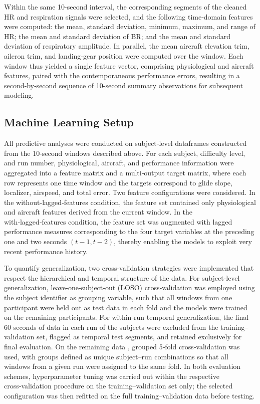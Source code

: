\documentclass[11pt, a4paper]{article}
\begin{document}
Within the same 10-second interval, the corresponding segments of the cleaned HR and respiration signals were selected, and the following time‑domain features were computed: the mean, standard deviation, minimum, maximum, and range of HR; the mean and standard deviation of BR; and the mean and standard deviation of respiratory amplitude. In parallel, the mean aircraft elevation trim, aileron trim, and landing‑gear position were computed over the window. Each window thus yielded a single feature vector, comprising physiological and aircraft features, paired with the contemporaneous performance errors, resulting in a second‑by‑second sequence of 10-second summary observations for subsequent modeling.

\subsection{Machine Learning Setup}
All predictive analyses were conducted on subject‑level dataframes constructed from the 10-second windows described above. For each subject, difficulty level, and run number, physiological, aircraft, and performance information were aggregated into a feature matrix and a multi‑output target matrix, where each row represents one time window and the targets correspond to glide slope, localizer, airspeed, and total error. Two feature configurations were considered. In the without‑lagged‑features  condition, the feature set contained only physiological and aircraft features derived from the current window. In the  with‑lagged‑features condition, the feature set was augmented with lagged performance measures corresponding to the four target variables at the preceding one and two seconds $(t-1, t-2)$, thereby enabling the models to exploit very recent performance history.

To quantify generalization, two cross‑validation strategies were implemented that respect the hierarchical and temporal structure of the data. For subject‑level generalization, leave‑one‑subject‑out (LOSO) cross‑validation was employed using the subject identifier as grouping variable, such that all windows from one participant were held out as test data in each fold and the models were trained on the remaining participants. For within‑run temporal generalization, the final 60 seconds of data in each run of the subjects were excluded from the training–validation set, flagged as temporal test segments, and retained exclusively for final evaluation. On the remaining data , grouped 5‑fold cross‑validation was used, with groups defined as unique subject–run combinations so that all windows from a given run were assigned to the same fold. In both evaluation schemes, hyperparameter tuning was carried out within the respective cross‑validation procedure on the training–validation set only; the selected configuration was then refitted on the full training–validation data before testing.
\end{document}
